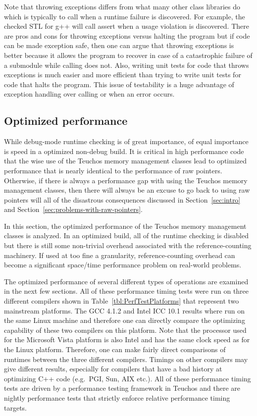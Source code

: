\documentclass[pdf,ps2pdf,11pt]{SANDreport}
\begin{document}
Note that throwing exceptions differs from what many other class
libraries do which is typically to call {} when a
runtime failure is discovered.  For example, the checked STL for g++
will call assert when a usage violation is discovered.  There are pros
and cons for throwing exceptions versus halting the program but if
code can be made exception safe, then one can argue that throwing
exceptions is better because it allows the program to recover in case
of a catastrophic failure of a submodule while calling
{} does not.  Also, writing unit tests for code that
throws exceptions is much easier and more efficient than trying to
write unit tests for code that halts the program.  This issue of
testability is a huge advantage of exception handling over calling
{} or {} when an error occurs.


%
{}\subsection{Optimized performance}
\label{sec:optimized-performance}
%

While debug-mode runtime checking is of great importance, of equal
importance is speed in a optimized non-debug build.  It is critical in
high performance code that the wise use of the Teuchos memory
management classes lead to optimized performance that is nearly
identical to the performance of raw pointers.  Otherwise, if there is
always a performance gap with using the Teuchos memory management
classes, then there will always be an excuse to go back to using raw
pointers will all of the disastrous consequences discussed in
Section~\ref{sec:intro} and
Section~\ref{sec:problems-with-raw-pointers}.

In this section, the optimized performance of the Teuchos memory
management classes is analyzed.  In an optimized build, all of the
runtime checking is disabled but there is still some non-trivial
overhead associated with the reference-counting machinery.  If used at
too fine a granularity, reference-counting overhead can become a
significant space/time performance problem on real-world problems.

The optimized performance of several different types of operations are
examined in the next few sections.  All of these performance timing
tests were run on three different compilers shown in
Table~\ref{tbl:PerfTestPlatforms} that represent two mainstream
platforms.  The GCC 4.1.2 and Intel ICC 10.1 results where run on the
same Linux machine and therefore one can directly compare the
optimizing capability of these two compilers on this platform.  Note
that the processor used for the Microsoft Vista platform is also Intel
and has the same clock speed as for the Linux platform.  Therefore,
one can make fairly direct comparisons of runtimes between the three
different compilers.  Timings on other compilers may give different
results, especially for compilers that have a bad history at
optimizing C++ code (e.g.\ PGI, Sun, AIX etc.).  All of these
performance timing tests are driven by a performance testing framework
in Teuchos and there are nightly performance tests that strictly
enforce relative performance timing targets.
\end{document}
